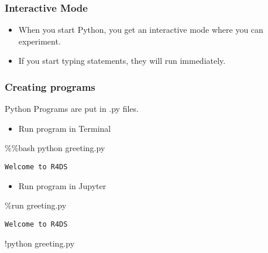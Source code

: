 \documentclass[
  letterpaper,
  DIV=11,
  numbers=noendperiod]{scrreprt}
\newenvironment{Shaded}{\begin{snugshade}}{\end{snugshade}}
\newcommand{\NormalTok}[1]{\textcolor[rgb]{0.00,0.46,0.62}{#1}}
\newcommand{\OperatorTok}[1]{\textcolor[rgb]{0.37,0.37,0.37}{#1}}
\providecommand{\tightlist}{%
  \setlength{\itemsep}{0pt}\setlength{\parskip}{0pt}}
\begin{document}
\hypertarget{interactive-mode}{%
\subsubsection{Interactive Mode}\label{interactive-mode}}

\begin{itemize}
\item
  When you start Python, you get an interactive mode where you can
  experiment.
\item
  If you start typing statements, they will run immediately.
\end{itemize}

\hypertarget{creating-programs}{%
\subsubsection{Creating programs}\label{creating-programs}}

Python Programs are put in .py files.

\begin{itemize}
\tightlist
\item
  Run program in Terminal
\end{itemize}

\begin{Shaded}
\begin{Highlighting}[]
\OperatorTok{\%\%}\NormalTok{bash}
\NormalTok{python greeting.py}
\end{Highlighting}
\end{Shaded}

\begin{verbatim}
Welcome to R4DS
\end{verbatim}

\begin{itemize}
\tightlist
\item
  Run program in Jupyter
\end{itemize}

\begin{Shaded}
\begin{Highlighting}[]
\OperatorTok{\%}\NormalTok{run greeting.py}
\end{Highlighting}
\end{Shaded}

\begin{verbatim}
Welcome to R4DS
\end{verbatim}

\begin{Shaded}
\begin{Highlighting}[]
\OperatorTok{!}\NormalTok{python greeting.py}
\end{Highlighting}
\end{Shaded}
\end{document}
